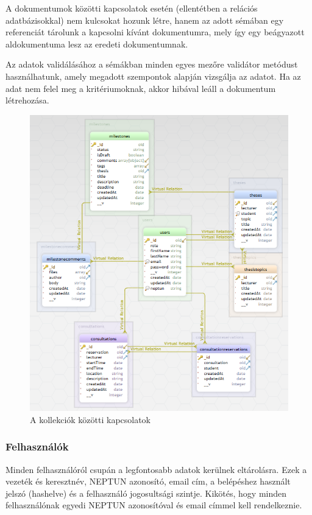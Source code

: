 \documentclass[
]{thesis-ekf}
\theoremstyle{definition}
\theoremstyle{remark}
\begin{document}
	A dokumentumok közötti kapcsolatok esetén (ellentétben a relációs adatbázisokkal) nem kulcsokat hozunk létre, hanem az adott sémában egy referenciát tárolunk a kapcsolni kívánt dokumentumra, mely így egy beágyazott aldokumentuma lesz az eredeti dokumentumnak. 
	
	Az adatok validálásához a sémákban minden egyes mezőre validátor metódust használhatunk, amely megadott szempontok alapján vizsgálja az adatot. Ha az adat nem felel meg a kritériumoknak, akkor hibával leáll a dokumentum létrehozása.
	
	\begin{figure}[!h]
		\centering
		\includegraphics[width=13cm]{kepek/db_erd.png}
		\caption{A kollekciók közötti kapcsolatok}
		\label{fig:db_erd}
	\end{figure}
	\newpage
	\subsubsection{Felhasználók}
	Minden felhasználóról csupán a legfontosabb adatok kerülnek eltárolásra. Ezek a vezeték és keresztnév, NEPTUN azonosító, email cím, a belépéshez használt jelszó (hashelve) és a felhasználó jogosultsági szintje. Kikötés, hogy minden felhasználónak egyedi NEPTUN azonosítóval és email címmel kell rendelkeznie.
	
\end{document}
